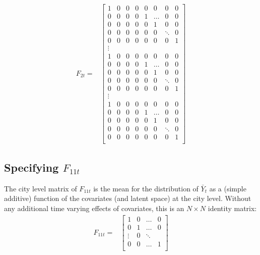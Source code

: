 \documentclass[letter,10pt]{article}
\begin{document}
\begin{equation}
\begin{array}{ll}
      F_{2t} = & \left[\begin{array}{cccccccc}
		1 & 0 & 0 & 0 & 0 & 0 & 0 & 0 \\
		0 &0 &0 &0 &1 &\ldots &0 &0\\
		0 & 0 & 0 & 0 & 0 &1 & 0 &0\\
		0 & 0 & 0 & 0 & 0 & 0 &\ddots &0\\
		0 & 0 & 0 & 0 & 0 &0 &0 & 1\\
\vdots\\
		1 & 0 & 0 & 0 & 0 & 0 & 0 & 0 \\
		0 &0 &0 &0 &1 &\ldots &0 &0\\
		0 & 0 & 0 & 0 & 0 &1 & 0 &0\\
		0 & 0 & 0 & 0 & 0 & 0 &\ddots &0\\
		0 & 0 & 0 & 0 & 0 &0 &0 & 1\\
\vdots\\
		1 & 0 & 0 & 0 & 0 & 0 & 0 & 0 \\
		0 &0 &0 &0 &1 &\ldots &0 &0\\
		0 & 0 & 0 & 0 & 0 &1 & 0 &0\\
		0 & 0 & 0 & 0 & 0 & 0 &\ddots &0\\
		0 & 0 & 0 & 0 & 0 &0 &0 & 1\\
		\end{array}\right]
\end{array}
\end{equation} 


\subsection{Specifying $F_{11t}$}

The city level matrix of $F_{11t}$ is the mean for the distribution of $\bar{Y}_t$ as a (simple additive) function
of the covariates (and latent space) at the city level.  Without any additional time varying effects of covariates,
this is an $N\times N$ identity matrix:
\begin{equation}
\begin{array}{ll}
      F_{11t} = & \left[\begin{array}{cccl}
		 1 & 0 & \ldots & 0 \\
		0 & 1 & \ldots & 0 \\
\vdots & 0 & \ddots \\
		0 & 0 & \ldots & 1 \\

		\end{array}\right]
\end{array}
\end{equation}
\end{document}
